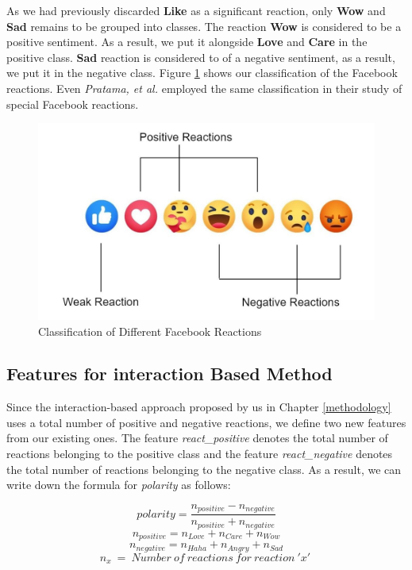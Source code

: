 As we had previously discarded \textbf{Like} as a significant reaction, only \textbf{Wow} and \textbf{Sad} remains to be grouped into classes. The reaction \textbf{Wow} is considered to be a positive sentiment. As a result, we put it alongside \textbf{Love} and \textbf{Care} in the positive class. \textbf{Sad} reaction is considered to of a negative sentiment, as a result, we put it in the negative class. Figure \ref{react_classification} shows our classification of the Facebook reactions. Even \textit{Pratama, et al.} \cite{paper_pratama} employed the same classification in their study of special Facebook reactions.

\begin{figure}
    \begin{center}
        \includegraphics[width=0.6 \linewidth]{figures/react_classification.JPG}
        \caption{Classification of Different Facebook Reactions}
        \label{react_classification}
    \end{center}
\end{figure}

\subsection{Features for interaction Based Method}
Since the interaction-based approach proposed by us in Chapter \ref{methodology} uses a total number of positive and negative reactions, we define two new features from our existing ones. The feature \textit{react\_positive} denotes the total number of reactions belonging to the positive class and the feature \textit{react\_negative} denotes the total number of reactions belonging to the negative class. As a result, we can write down the formula for \textit{polarity} as follows: \

$$  polarity = \frac{n_{positive} - n_{negative}}{n_{positive} + n_{negative}}  $$
$$  n_{positive} = n_{Love} + n_{Care} + n_{Wow}                                $$
$$  n_{negative} = n_{Haha} + n_{Angry} + n_{Sad}                               $$
$$  n_{x}\ =\ Number\ of\ reactions\ for\ reaction\ 'x'\                        $$        

